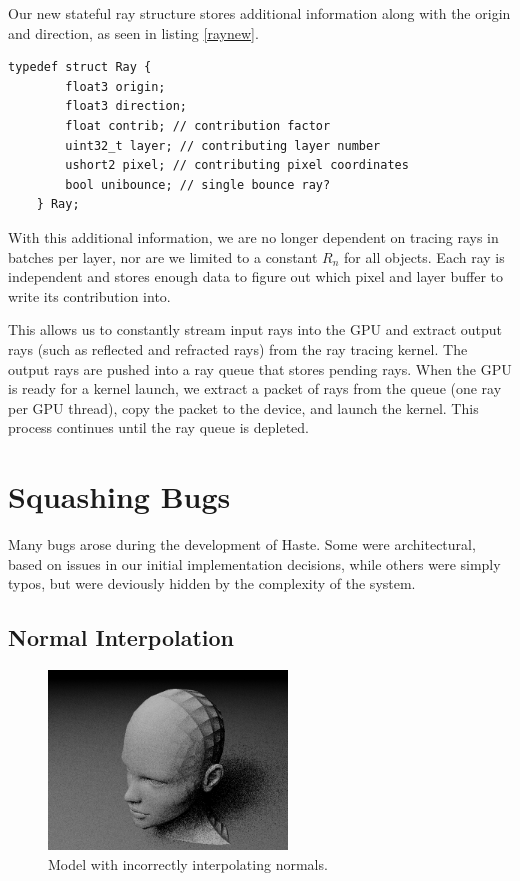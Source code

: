 \documentclass{acmsiggraph}                     %
\begin{document}
    Our new stateful ray structure stores additional information along with the origin and
    direction, as seen in listing \ref{raynew}.

    \begin{lstlisting}[caption=A stateful ray structure.,label=raynew]
    typedef struct Ray {
        float3 origin;
        float3 direction;
        float contrib; // contribution factor
        uint32_t layer; // contributing layer number
        ushort2 pixel; // contributing pixel coordinates
        bool unibounce; // single bounce ray?
    } Ray;
    \end{lstlisting}

    With this additional information, we are no longer dependent on tracing rays in batches
    per layer, nor are we limited to a constant $R_{n}$ for all objects. Each ray is
    independent and stores enough data to figure out which pixel and layer buffer to
    write its contribution into.

    This allows us to constantly stream input rays into the GPU and extract output rays (such
    as reflected and refracted rays) from the ray tracing kernel. The output rays are pushed
    into a ray queue that stores pending rays. When the GPU is ready for a kernel launch,
    we extract a packet of rays from the queue (one ray per GPU thread), copy the packet to
    the device, and launch the kernel. This process continues until the ray queue is depleted.

\section{Squashing Bugs}
\label{sec:bugs}

Many bugs arose during the development of Haste. Some were architectural, based 
on issues in our initial implementation decisions, while others were simply typos,
but were deviously hidden by the complexity of the system.

    \subsection{Normal Interpolation}
    \label{sec:normallerp} 

    \begin{figure}[htb]
        \begin{center}
            \leavevmode
            \includegraphics[width=2.5in]{badnormals.jpg}
        \end{center}
        \caption{Model with incorrectly interpolating normals.}
        \label{fig:bad_normals}
    \end{figure}
\end{document}
